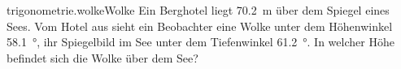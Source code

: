 \begin{exercise}{trigonometrie.wolke}{Wolke}
  \ifproblem\problem
    Ein Berghotel liegt \SI{70.2}{\metre} über dem Spiegel eines Sees.
    Vom Hotel aus sieht ein Beobachter eine Wolke unter dem Höhenwinkel
    \SI{58.1}{\degree}, ihr Spiegelbild im See unter dem Tiefenwinkel
    \SI{61.2}{\degree}. In welcher Höhe befindet sich die Wolke
    über dem See?
  \fi
\end{exercise}
